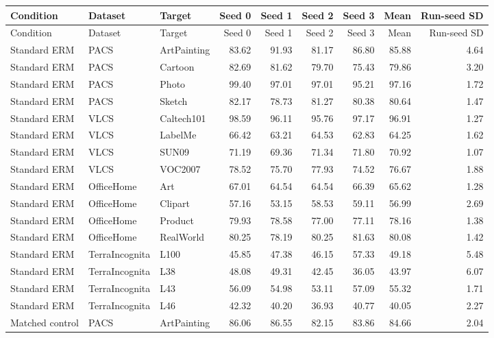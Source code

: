 \begin{longtable}{lllrrrrrr}
\toprule
Condition & Dataset & Target & Seed 0 & Seed 1 & Seed 2 & Seed 3 & Mean & Run-seed SD \\
\midrule
\endfirsthead
\toprule
Condition & Dataset & Target & Seed 0 & Seed 1 & Seed 2 & Seed 3 & Mean & Run-seed SD \\
\midrule
\endhead
\bottomrule
\endlastfoot
Standard ERM & PACS & ArtPainting & 83.62 & 91.93 & 81.17 & 86.80 & 85.88 & 4.64 \\
Standard ERM & PACS & Cartoon & 82.69 & 81.62 & 79.70 & 75.43 & 79.86 & 3.20 \\
Standard ERM & PACS & Photo & 99.40 & 97.01 & 97.01 & 95.21 & 97.16 & 1.72 \\
Standard ERM & PACS & Sketch & 82.17 & 78.73 & 81.27 & 80.38 & 80.64 & 1.47 \\
Standard ERM & VLCS & Caltech101 & 98.59 & 96.11 & 95.76 & 97.17 & 96.91 & 1.27 \\
Standard ERM & VLCS & LabelMe & 66.42 & 63.21 & 64.53 & 62.83 & 64.25 & 1.62 \\
Standard ERM & VLCS & SUN09 & 71.19 & 69.36 & 71.34 & 71.80 & 70.92 & 1.07 \\
Standard ERM & VLCS & VOC2007 & 78.52 & 75.70 & 77.93 & 74.52 & 76.67 & 1.88 \\
Standard ERM & OfficeHome & Art & 67.01 & 64.54 & 64.54 & 66.39 & 65.62 & 1.28 \\
Standard ERM & OfficeHome & Clipart & 57.16 & 53.15 & 58.53 & 59.11 & 56.99 & 2.69 \\
Standard ERM & OfficeHome & Product & 79.93 & 78.58 & 77.00 & 77.11 & 78.16 & 1.38 \\
Standard ERM & OfficeHome & RealWorld & 80.25 & 78.19 & 80.25 & 81.63 & 80.08 & 1.42 \\
Standard ERM & TerraIncognita & L100 & 45.85 & 47.38 & 46.15 & 57.33 & 49.18 & 5.48 \\
Standard ERM & TerraIncognita & L38 & 48.08 & 49.31 & 42.45 & 36.05 & 43.97 & 6.07 \\
Standard ERM & TerraIncognita & L43 & 56.09 & 54.98 & 53.11 & 57.09 & 55.32 & 1.71 \\
Standard ERM & TerraIncognita & L46 & 42.32 & 40.20 & 36.93 & 40.77 & 40.05 & 2.27 \\
Matched control & PACS & ArtPainting & 86.06 & 86.55 & 82.15 & 83.86 & 84.66 & 2.04 \\

\end{longtable}

